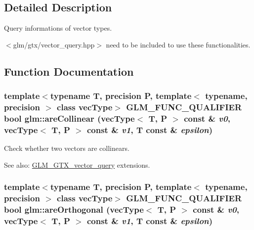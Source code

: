 \subsection{Detailed Description}
Query informations of vector types. 

$<$glm/gtx/vector\_\-query.hpp$>$ need to be included to use these functionalities. 

\subsection{Function Documentation}
\hypertarget{group__gtx__vector__query_gbfc6fa0b52f1ad33ffe31d41535f7069}{
\subsubsection[areCollinear]{\setlength{\rightskip}{0pt plus 5cm}template$<$typename T, precision P, template$<$ typename, precision $>$ class vecType$>$ GLM\_\-FUNC\_\-QUALIFIER bool glm::areCollinear (vecType$<$ T, P $>$ const \& {\em v0}, \/  vecType$<$ T, P $>$ const \& {\em v1}, \/  T const \& {\em epsilon})}}
\label{group__gtx__vector__query_gbfc6fa0b52f1ad33ffe31d41535f7069}


Check whether two vectors are collinears. \begin{Desc}
\item[See also:]\hyperlink{group__gtx__vector__query}{GLM\_\-GTX\_\-vector\_\-query} extensions. \end{Desc}
\hypertarget{group__gtx__vector__query_g9af1cd34fdb7c3cdeb11c0235fe7c468}{
\subsubsection[areOrthogonal]{\setlength{\rightskip}{0pt plus 5cm}template$<$typename T, precision P, template$<$ typename, precision $>$ class vecType$>$ GLM\_\-FUNC\_\-QUALIFIER bool glm::areOrthogonal (vecType$<$ T, P $>$ const \& {\em v0}, \/  vecType$<$ T, P $>$ const \& {\em v1}, \/  T const \& {\em epsilon})}}
\label{group__gtx__vector__query_g9af1cd34fdb7c3cdeb11c0235fe7c468}


